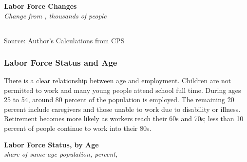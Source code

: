 \documentclass{report}
\newcommand{\abar}[4]{
		\addplot[stack plots=y, area style, draw=none, fill=#1] 
			table [x=#2, y=#3, col sep=comma]{#4}\closedcycle;}
\newcommand{\stdnode}[3]{\node[below, align=left, shift=({#1,#2})]{#3};}
\begin{document}
{\begin{minipage}{0.76\textwidth}
\normalsize \textbf{Labor Force Changes}\\
\footnotesize{\textit{Change from \unskip, thousands of people}}\\
\noindent {} \setlength{\tabcolsep}{3.0pt} \color{black!90}
		{\renewcommand{\arraystretch}{1.52}
		 \begin{tabular}{p{27.8mm} R{11.2mm} R{10.4mm} R{10.4mm} R{10.2mm} 
		 				 R{10.6mm} R{10.4mm} R{10.4mm}}
			  \hline
		\end{tabular}}
		\vspace{-2mm}
		
\footnotesize{Source: Author's Calculations from CPS}
\end{minipage}
\newpage
\begin{minipage}{0.76\textwidth}
\subsubsection*{Labor Force Status and Age}
\small There is a clear relationship between age and employment. Children are not permitted to work and many young people attend school full time. During ages 25 to 54, around 80 percent of the population is employed. The remaining 20 percent include caregivers and those unable to work due to disability or illness. Retirement becomes more likely as workers reach their 60s and 70s; less than 10 percent of people continue to work into their 80s. 
\vspace{1mm}

\normalsize \textbf{Labor Force Status, by Age}\\
\footnotesize{\textit{share of same-age population, percent, }}\\
\hspace*{-3mm} 
\vspace{-1mm}


\end{minipage}}
\end{document}
